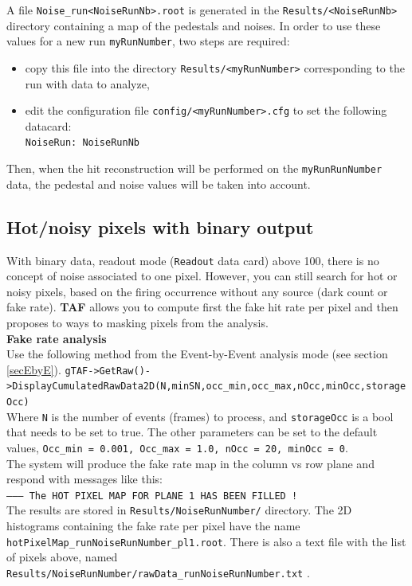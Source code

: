 \documentclass[a4paper, 12pt, twoside]{article}
\newcommand{\TAF}{{\bf TAF }}
\begin{document}
\noindent
A file {\tt Noise\_run<NoiseRunNb>.root} is generated in the {\tt Results/<NoiseRunNb>} directory containing a map of the pedestals and noises. In order to use these values for a new run {\tt myRunNumber}, two steps are required:
\begin{itemize}
\item copy this file into the directory {\tt Results/<myRunNumber>} corresponding to the run with data to analyze,
\item edit the configuration file {\tt config/<myRunNumber>.cfg} to set the following datacard:\\
{\tt NoiseRun:        NoiseRunNb}
\end{itemize}
Then, when the hit reconstruction will be performed on the {\tt myRunRunNumber} data, the pedestal and noise values will be taken into account.


\subsection{Hot/noisy pixels with binary output}
\label{subsec:binaryNoise}

With binary data, readout mode ({\tt Readout} data card) above 100, there is no concept of noise associated to one pixel. However, you can still search for hot or noisy pixels, based on the firing occurrence without any source (dark count or fake rate). \TAF allows you to compute first the fake hit rate per pixel and then proposes to ways to masking pixels from the analysis.\\

\noindent
{\bf Fake rate analysis}\\

\noindent
Use the following method from the Event-by-Event analysis mode (see section \ref{secEbyE}).
{\tt gTAF->GetRaw()->DisplayCumulatedRawData2D(N,minSN,occ\_min,occ\_max,nOcc,minOcc,storageOcc)}\\
 Where {\tt N} is the number of events (frames) to process, and {\tt storageOcc} is a bool that needs to be set to true. The other parameters can be set to the default values, {\tt Occ\_min = 0.001, Occ\_max = 1.0, nOcc = 20, minOcc = 0}.\\
 The system will produce the fake rate map in the column vs row plane and respond with messages like this:\\
{\tt -------- The HOT PIXEL MAP FOR PLANE 1 HAS BEEN FILLED !}\\
The results are stored in {\tt Results/NoiseRunNumber/} directory. The 2D histograms containing the fake rate per pixel have the name {\tt hotPixelMap\_runNoiseRunNumber\_pl1.root}. There is also a text file with the list of pixels above, named {\tt Results/NoiseRunNumber/rawData\_runNoiseRunNumber.txt} .
\end{document}
